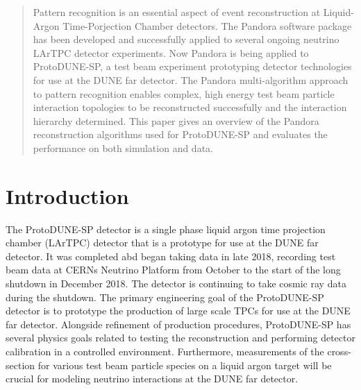 
\date{Received: date / Accepted: date}

\maketitle

\begin{abstract}
Pattern recognition is an essential aspect of event reconstruction at Liquid-Argon Time-Porjection Chamber detectors.  The Pandora software package has been developed and successfully applied to several ongoing neutrino LArTPC detector experiments.  Now Pandora is being applied to ProtoDUNE-SP, a test beam experiment prototyping detector technologies for use at the DUNE far detector.  The Pandora multi-algorithm approach to pattern recognition enables complex, high energy test beam particle interaction topologies to be reconstructed successfully and the interaction hierarchy determined.  This paper gives an overview of the Pandora reconstruction algorithms used for ProtoDUNE-SP and evaluates the performance on both simulation and data.
\end{abstract}

\section{Introduction}
\label{sec:intro}
The ProtoDUNE-SP detector is a single phase liquid argon time projection chamber (LArTPC) detector that is a prototype for use at the DUNE far detector.  It was completed abd began taking data in late 2018, recording test beam data at CERNs Neutrino Platform from October to the start of the long shutdown in December 2018.  The detector is continuing to take cosmic ray data during the shutdown.  The primary engineering goal of the ProtoDUNE-SP detector is to prototype the production of large scale TPCs for use at the DUNE far detector.  Alongside refinement of production procedures, ProtoDUNE-SP has several physics goals related to testing the reconstruction and performing detector calibration in a controlled environment.  Furthermore, measurements of the cross-section for various test beam particle species on a liquid argon target will be crucial for modeling neutrino interactions at the DUNE far detector.

